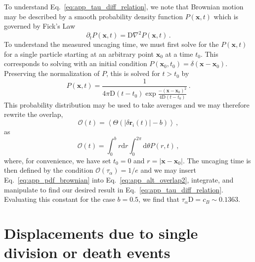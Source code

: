 \documentclass[
reprint
,aps
,amssymb
,amsmath
,superscriptaddress
]{revtex4-1}
\begin{document}
To understand Eq.~\ref{eq:app_tau_diff_relation}, we note that Brownian motion may be described by a smooth probability density function $P(\mathbf{x}, t)$ which is governed by Fick's Law
%
\begin{equation}\label{eq:app_fick}
\partial_t P(\mathbf{x}, t) = \mathrm{D} \nabla^2 P(\mathbf{x}, t) \, .
\end{equation}
%
To understand the measured uncaging time, we must first solve for the $P(\mathbf{x}, t)$ for a single particle starting at an arbitrary point $\mathbf{x}_0$ at a time $t_0$. This corresponds to solving with an initial condition $P(\mathbf{x}_0, t_0) = \delta(\mathbf{x} - \mathbf{x}_0)$. Preserving the normalization of $P$, this is solved for $t>t_0$ by
%
\begin{equation}\label{eq:app_pdf_brownian}
P(\mathbf{x}, t) = \frac{1}{4 \pi \mathrm{D} (t-t_0) \exp{\frac{-(\mathbf{x} - \mathbf{x}_0)^2}{4 \mathrm{D} (t-t_0)}}} \, .
\end{equation}
%
This probability distribution may be used to take averages and we may therefore rewrite the overlap,
%
\begin{equation}\label{eq:app_alt_overlap}
\mathcal{O}(t) = \left\langle \Theta(|\delta \mathbf{r}_i(t)| - b) \right\rangle \, ,
\end{equation}
%
as 
%
\begin{equation}\label{eq:app_alt_overlap2}
\mathcal{O}(t) = \int_0^b r \mathrm{d}r \int_0^{2 \pi} \mathrm{d}\theta P(r, t)  \, ,
\end{equation}
%
where, for convenience, we have set $t_0 =0$ and $r = |\mathbf{x} - \mathbf{x}_0|$. The uncaging time is then defined by the condition $\mathcal{O}(\tau_\alpha) = 1/e$ and we may insert Eq.~\ref{eq:app_pdf_brownian} into Eq.~\ref{eq:app_alt_overlap2}, integrate, and manipulate to find our desired result in Eq.~\ref{eq:app_tau_diff_relation}. Evaluating this constant for the case $b=0.5$, we find that $\tau_\alpha \mathrm{D} = c_B \sim 0.1363$. 







\section{Displacements due to single division or death events\label{app:single_events}}
\end{document}
